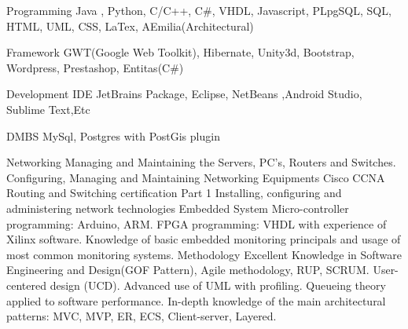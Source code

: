 


\begin{cvskills}


\cvskill
{Programming} %
{Java , Python, C/C++, C\#, VHDL, Javascript, PLpgSQL, SQL, HTML, UML, CSS, LaTex, AEmilia(Architectural)  } %

\hline

\cvskill
{Framework} %
{GWT(Google Web Toolkit), Hibernate, Unity3d, Bootstrap, Wordpress, Prestashop, Entitas(C\#) } %

\hline

\cvskill
{Development IDE} %
{JetBrains Package, Eclipse, NetBeans ,Android Studio, Sublime Text,Etc} %

\hline


\cvskill
{DMBS} %
{MySql, Postgres with PostGis plugin} %

\hline

\cvskill
{Networking} %
{Managing and Maintaining the Servers, PC's, Routers and Switches.
	Configuring, Managing and Maintaining \newline Networking Equipments
	Cisco CCNA Routing and Switching certification Part 1
	Installing, configuring and \newline administering network technologies 
} %
\hline
\cvskill
{Embedded System} %
{Micro-controller programming: Arduino, ARM. 
 FPGA programming: VHDL with experience of Xilinx software. \newline
 Knowledge of basic embedded monitoring principals and usage of most common monitoring systems. 
} %
\hline
\cvskill
{Methodology} %
{Excellent Knowledge in Software Engineering and Design(GOF Pattern), Agile methodology, RUP, SCRUM. \newline User-centered design (UCD).
 Advanced use of UML with profiling. Queueing theory applied to software \newline performance. In-depth knowledge of the main architectural patterns: MVC, MVP, ER, ECS, Client-server, \newline Layered.
} %


\end{cvskills}
